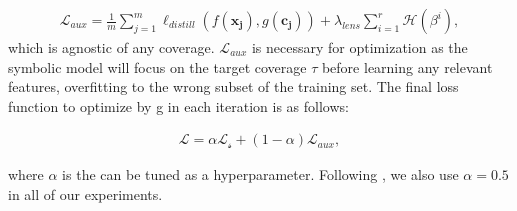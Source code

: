 \begin{align}
\label{equ:aux}
\mathcal{L}_{aux} = \frac{1}{m}\sum_{j=1}^m\ell_{distill}(f(\boldsymbol{x_j}), g(\boldsymbol{c_j})) + \lambda_{lens}\sum_{i=1}^r\mathcal{H}(\beta^i),
\end{align}
which is agnostic of any coverage. $\mathcal{L}_{aux}$ is necessary for optimization as the symbolic model will focus on the target coverage $\tau$ before learning any relevant features, overfitting to the wrong subset of the training set. The final loss function to optimize by g in each iteration is as follows:

\begin{align}
\label{equ:final_loss_g}
\mathcal{L} = \alpha \mathcal{L_s} + (1 - \alpha)\mathcal{L}_{aux},
\end{align}

where $\alpha$ is the can be tuned as a hyperparameter. Following \cite{geifman2019selectivenet}, we also use $\alpha=0.5$ in all of our experiments.